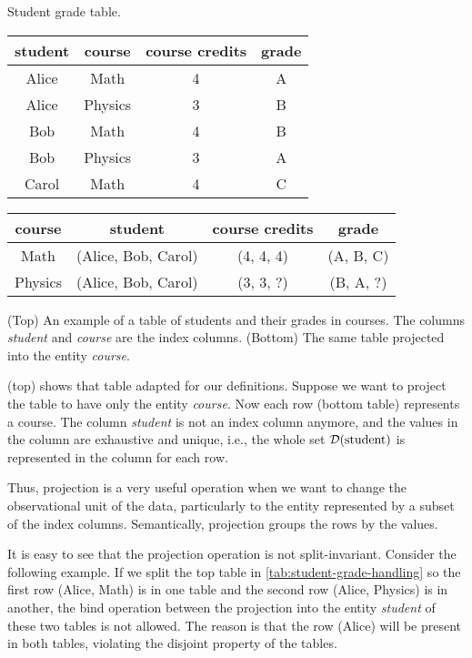 \begin{tablebox}[label=tab:student-grade-handling]{Student grade table.}
  \centering
  \begin{tabular}{cccc}
    \toprule
    \textbf{student} & \textbf{course} & \textbf{course credits} & \textbf{grade} \\
    \midrule
    Alice & Math & 4 & A \\
    Alice & Physics & 3 & B \\
    Bob & Math & 4 & B \\
    Bob & Physics & 3 & A \\
    Carol & Math & 4 & C \\
    \bottomrule
  \end{tabular}

  \vspace{1em}
  \begin{tabular}{cccc}
    \toprule
    \textbf{course} & \textbf{student} & \textbf{course credits} & \textbf{grade} \\
    \midrule
    Math & (Alice, Bob, Carol) & (4, 4, 4) & (A, B, C) \\
    Physics & (Alice, Bob, Carol) & (3, 3, ?) & (B, A, ?) \\
    \bottomrule
  \end{tabular}
  \tcblower
  (Top) An example of a table of students and their grades in courses.  The columns
  \emph{student} and \emph{course} are the index columns. (Bottom) The same table
  projected into the entity \emph{course}.
\end{tablebox}

 (top) shows that table adapted for our definitions.
Suppose we want to project the table to have only the entity \emph{course}.
Now each row (bottom table) represents a course.  The column \emph{student} is not an
index column anymore, and the values in the column are exhaustive and unique, i.e.,
the whole set $\mathcal{D}\!\left(\text{student}\right)$ is represented in the column for each row.

Thus, projection is a very useful operation when we want to change the observational unit
of the data, particularly to the entity represented by a subset of the index columns.
Semantically, projection groups the rows by the values.

It is easy to see that the projection operation is not split-invariant.  Consider the
following example. If we split the top table in \cref{tab:student-grade-handling} so the
first row (Alice, Math) is in one table and the second row (Alice, Physics) is in another,
the bind operation between the projection into the entity \emph{student} of these two
tables is not allowed.  The reason is that the row (Alice) will be present in both tables,
violating the disjoint property of the tables.

